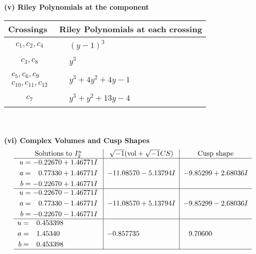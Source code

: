 \documentclass[1p]{elsarticle_modified}
\theoremstyle{definition}
\newcommand{\I}{\sqrt{-1}}
\begin{document}
\flushleft \textbf{(v) Riley Polynomials at the component}\newline \\
\begin{tabular}{m{50pt}|m{274pt}}
Crossings & \hspace{64pt}Riley Polynomials at each crossing \\
\hline $$\begin{aligned}c_{1},c_{2},c_{4}\end{aligned}$$&$\begin{aligned}
&(y-1)^3
\end{aligned}$\\
\hline $$\begin{aligned}c_{3},c_{8}\end{aligned}$$&$\begin{aligned}
&y^3
\end{aligned}$\\
\hline $$\begin{aligned}c_{5},c_{6},c_{9}\\c_{10},c_{11},c_{12}\end{aligned}$$&$\begin{aligned}
&y^3+4 y^2+4 y-1
\end{aligned}$\\
\hline $$\begin{aligned}c_{7}\end{aligned}$$&$\begin{aligned}
&y^3+y^2+13 y-4
\end{aligned}$\\
\hline
\end{tabular}\\~\\
\newpage\flushleft \textbf{(vi) Complex Volumes and Cusp Shapes}
$$\begin{array}{c|c|c}  
\text{Solutions to }I^u_{2}& \I (\text{vol} + \sqrt{-1}CS) & \text{Cusp shape}\\
 \hline 
\begin{aligned}
u &= -0.22670 + 1.46771 I \\
a &= \phantom{-}0.77330 + 1.46771 I \\
b &= -0.22670 + 1.46771 I\end{aligned}
 & -11.08570 - 5.13794 I & -9.85299 + 2.68036 I \\ \hline\begin{aligned}
u &= -0.22670 - 1.46771 I \\
a &= \phantom{-}0.77330 - 1.46771 I \\
b &= -0.22670 - 1.46771 I\end{aligned}
 & -11.08570 + 5.13794 I & -9.85299 - 2.68036 I \\ \hline\begin{aligned}
u &= \phantom{-}0.453398\phantom{ +0.000000I} \\
a &= \phantom{-}1.45340\phantom{ +0.000000I} \\
b &= \phantom{-}0.453398\phantom{ +0.000000I}\end{aligned}
 & -0.857735\phantom{ +0.000000I} & \phantom{-}9.70600\phantom{ +0.000000I}\\
 \hline 
 \end{array}$$\newpage\newpage\renewcommand{\arraystretch}{1}
\end{document}

